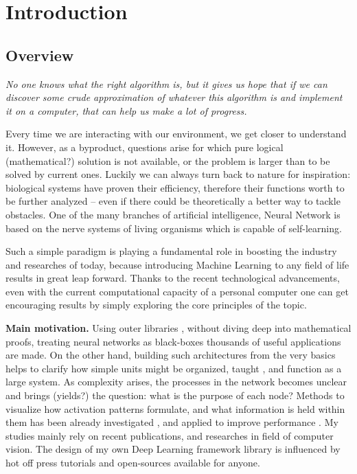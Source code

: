 \chapter{Introduction}
\section{Overview}


\epigraph{\textit{No one knows what the right algorithm is, but it gives us hope that if we can discover some crude approximation of whatever this algorithm is and implement it on a computer, that can help us make a lot of progress.}}{}

Every time we are interacting with our environment, we get closer to understand it. %
However, as a byproduct, questions arise for which pure logical (mathematical?) solution is not available, or the problem is larger than to be solved by current ones.
Luckily we can always turn back to nature for inspiration: biological systems have proven their efficiency, therefore their functions worth to be further analyzed -- even if there could be theoretically a better way to tackle obstacles. 
One of the many branches of artificial intelligence, Neural Network is based on the nerve systems of living organisms which is capable of self-learning.

Such a simple paradigm is playing a fundamental role in boosting the industry and researches of today, because introducing Machine Learning to any field of life results in great leap forward. 
Thanks to the recent technological advancements, even with the current computational capacity of a personal computer one can get encouraging results by simply exploring the core principles of the topic.

\textbf{Main motivation.} Using outer libraries \cite{TF, torch, caffe}, without diving deep into mathematical proofs, treating neural networks as black-boxes thousands of useful applications \cite{haykin2004comprehensive} are made. 
On the other hand, building such architectures from the very basics helps to clarify how simple units might be organized, taught \cite{werbos1994roots}, and function \cite{hornik1989multilayer} as a large system. 
As complexity arises, the processes in the network becomes unclear and brings (yields?) the question: what is the purpose of each node? 
Methods to visualize how activation patterns formulate, and what information is held within them has been already investigated \cite{yosinski2015understanding}, and applied to improve performance \cite{zeiler2014visualizing}. 
My studies mainly rely on recent publications, and researches in field of computer vision. The design of my own Deep Learning framework library is influenced by hot off press tutorials \cite{Goodfellow-et-al-2016-Book, deeplearningdotnet, nnsdl, stanfordlectures, gibiansky} and open-sources \cite{TF, torch, caffe} available for anyone. 


